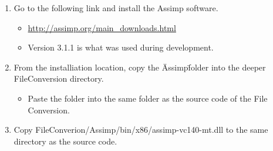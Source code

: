 \begin{enumerate}
    \item Go to the following link and install the Assimp software.
    \begin{itemize}
        \item \url{http://assimp.org/main_downloads.html}
        \item Version 3.1.1 is what was used during development.
    \end{itemize}

    \item From the installiation location, copy the \"Assimp\" folder into the deeper FileConversion directory.
    \begin{itemize}
        \item Paste the folder into the same folder as the source code of the File Conversion.
    \end{itemize}

    \item Copy FileConverion/Assimp/bin/x86/assimp-vc140-mt.dll to the same directory as the source code.
\end{enumerate}